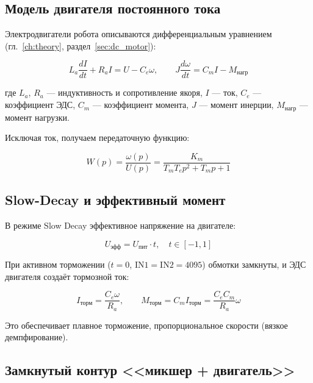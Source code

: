 \subsection{Модель двигателя постоянного тока}

Электродвигатели робота описываются дифференциальным уравнением
(гл.~\ref{ch:theory}, раздел~\ref{sec:dc_motor}):

\begin{equation}
  L_a \frac{dI}{dt} + R_a I = U - C_e \omega, \qquad
  J \frac{d\omega}{dt} = C_m I - M_{\text{нагр}}
  \label{eq:motor_electrical}
\end{equation}

где $L_a$, $R_a$ --- индуктивность и сопротивление якоря, $I$ --- ток,
$C_e$ --- коэффициент ЭДС, $C_m$ --- коэффициент момента,
$J$ --- момент инерции, $M_{\text{нагр}}$ --- момент нагрузки.

Исключая ток, получаем передаточную функцию:

\begin{equation}
  W(p) = \frac{\omega(p)}{U(p)} = \frac{K_m}{T_m T_e p^2 + T_m p + 1}
  \label{eq:motor_full_tf}
\end{equation}

\subsection{Slow-Decay и эффективный момент}

В режиме Slow Decay эффективное напряжение на двигателе:

\begin{equation}
  U_{\text{эфф}} = U_{\text{пит}} \cdot t, \quad t \in [-1, 1]
  \label{eq:slow_decay_voltage}
\end{equation}

При активном торможении ($t = 0$, $\text{IN1} = \text{IN2} = 4095$)
обмотки замкнуты, и ЭДС двигателя создаёт тормозной ток:

\begin{equation}
  I_{\text{торм}} = \frac{C_e \omega}{R_a}, \qquad
  M_{\text{торм}} = C_m I_{\text{торм}} = \frac{C_e C_m}{R_a}\omega
  \label{eq:brake_torque}
\end{equation}

Это обеспечивает плавное торможение, пропорциональное скорости
(вязкое демпфирование).

\subsection{Замкнутый контур <<микшер + двигатель>>}

